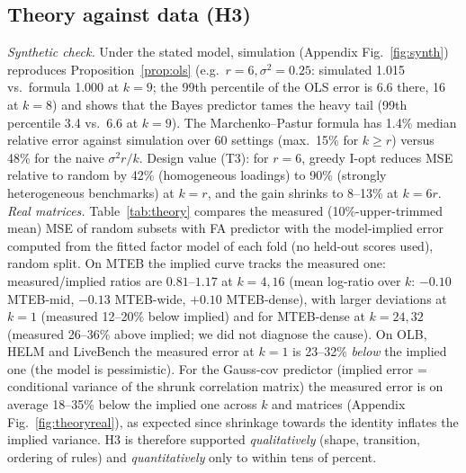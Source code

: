 \documentclass{article}
\begin{document}
\subsection{Theory against data (H3)}
\emph{Synthetic check.} Under the stated model, simulation (Appendix Fig.~\ref{fig:synth}) reproduces Proposition~\ref{prop:ols} (e.g.\ $r=6,\sigma^2=0.25$: simulated 1.015 vs.\ formula 1.000 at $k=9$; the 99th percentile of the OLS error is 6.6 there, 16 at $k=8$) and shows that the Bayes predictor tames the heavy tail (99th percentile 3.4 vs.\ 6.6 at $k=9$). The Marchenko--Pastur formula has 1.4\% median relative error against simulation over 60 settings (max.\ 15\% for $k\ge r$) versus 48\% for the naive $\sigma^2r/k$. Design value (T3): for $r=6$, greedy I-opt reduces MSE relative to random by 42\% (homogeneous loadings) to 90\% (strongly heterogeneous benchmarks) at $k=r$, and the gain shrinks to 8--13\% at $k=6r$.
\emph{Real matrices.} Table~\ref{tab:theory} compares the measured (10\%-upper-trimmed mean) MSE of random subsets with FA predictor with the model-implied error computed from the fitted factor model of each fold (no held-out scores used), random split. On MTEB the implied curve tracks the measured one: measured/implied ratios are $0.81$--$1.17$ at $k=4,16$ (mean log-ratio over $k$: $-0.10$ MTEB-mid, $-0.13$ MTEB-wide, $+0.10$ MTEB-dense), with larger deviations at $k=1$ (measured 12--20\% below implied) and for MTEB-dense at $k=24,32$ (measured 26--36\% above implied; we did not diagnose the cause). On OLB, HELM and LiveBench the measured error at $k=1$ is 23--32\% \emph{below} the implied one (the model is pessimistic). For the Gauss-cov predictor (implied error = conditional variance of the shrunk correlation matrix) the measured error is on average 18--35\% below the implied one across $k$ and matrices (Appendix Fig.~\ref{fig:theoryreal}), as expected since shrinkage towards the identity inflates the implied variance. H3 is therefore supported \emph{qualitatively} (shape, transition, ordering of rules) and \emph{quantitatively} only to within tens of percent.
\begin{table}[t]
\caption{Measured / model-implied MSE$_z$ for random $k$-subsets with the FA predictor (random split; measured = 10\%-trimmed mean over held-out models). $\bar\psi$: mean fitted noise variance.}\label{tab:theory}
\centering\small
\end{table}
\end{document}
